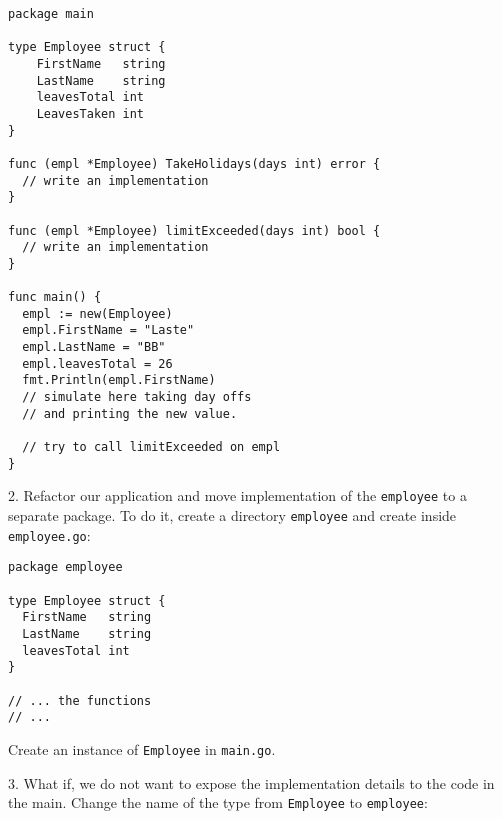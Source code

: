 \documentclass[11pt, letterpaper]{article}
\begin{document}
\begin{verbatim}
package main

type Employee struct {
    FirstName   string
    LastName    string
    leavesTotal int
    LeavesTaken int
}

func (empl *Employee) TakeHolidays(days int) error {
  // write an implementation
}

func (empl *Employee) limitExceeded(days int) bool {
  // write an implementation
}

func main() {
  empl := new(Employee)
  empl.FirstName = "Laste"
  empl.LastName = "BB"
  empl.leavesTotal = 26
  fmt.Println(empl.FirstName)
  // simulate here taking day offs
  // and printing the new value.

  // try to call limitExceeded on empl
}
\end{verbatim}

\bigskip







\bigskip

2. Refactor our application and move implementation of the \verb|employee| to a separate package. To do it, create a directory \verb|employee| and create inside \verb|employee.go|:

\begin{verbatim}
package employee

type Employee struct {
  FirstName   string
  LastName    string
  leavesTotal int
}

// ... the functions
// ...

\end{verbatim}

Create an instance of \verb|Employee| in \verb|main.go|.

\bigskip

3. What if, we do not want to expose the implementation details to the code in the main. Change the name of the type from \verb|Employee| to \verb|employee|:
\end{document}

